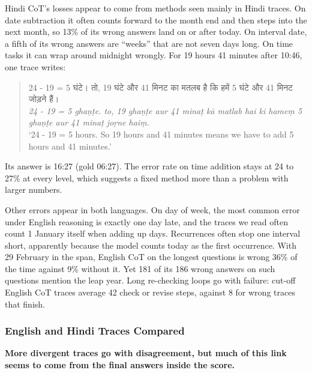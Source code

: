 \documentclass[11pt]{article}
\newcommand{\hi}[1]{\foreignlanguage{hindi}{#1}}
\begin{document}
Hindi CoT's losses appear to come from methods seen mainly in Hindi traces. On date subtraction it often counts forward to the month end and then steps into the next month, so 13\% of its wrong answers land on or after today. On interval date, a fifth of its wrong answers are ``weeks'' that are not seven days long. On time tasks it can wrap around midnight wrongly. For 19 hours 41 minutes after 10:46, one trace writes:
\begin{quote}
\begin{minipage}{\linewidth}
\hi{24 - 19 = 5 घंटे। तो, 19 घंटे और 41 मिनट का मतलब है कि हमें 5 घंटे और 41 मिनट जोड़ने हैं।}\\
\emph{24 - 19 = 5 ghaṇṭe. to, 19 ghaṇṭe aur 41 minaṭ kā matlab hai ki hameṃ 5 ghaṇṭe aur 41 minaṭ joṛne haiṃ.}\\
`24 - 19 = 5 hours. So 19 hours and 41 minutes means we have to add 5 hours and 41 minutes.'
\end{minipage}
\end{quote}
Its answer is 16:27 (gold 06:27). The error rate on time addition stays at 24 to 27\% at every level, which suggests a fixed method more than a problem with larger numbers.

Other errors appear in both languages. On day of week, the most common error under English reasoning is exactly one day late, and the traces we read often count 1 January itself when adding up days. Recurrences often stop one interval short, apparently because the model counts today as the first occurrence. With 29 February in the span, English CoT on the longest questions is wrong 36\% of the time against 9\% without it. Yet 181 of its 186 wrong answers on such questions mention the leap year. Long re-checking loops go with failure: cut-off English CoT traces average 42 check or revise steps, against 8 for wrong traces that finish.

\subsubsection{English and Hindi Traces Compared}
\label{sec:rds}

\textbf{More divergent traces go with disagreement, but much of this link seems to come from the final answers inside the score.}
\end{document}
